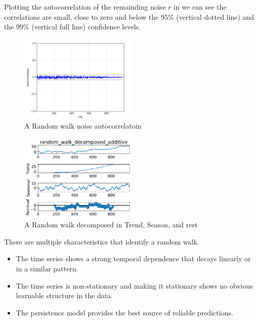Plotting the autocorrelation of the remainding noise $r$ in 
we can see the correlations are small, close to zero and below the 95\% (vertical dotted line) and the 99\% (vertical full line)
confidence levels.
\begin{figure}[H]
  \centering
  \includegraphics[width=0.5\textwidth]{./figs/illustrations/random_walk_noise_autocorrelation.png}
  \hfill
  \caption{A Random walk noise autocorrelatoin}
  \label{fig:dataset:random_walk_noise_autocorrelation}
\end{figure}
\begin{figure}[H]
  \centering
  \includegraphics[width=0.5\textwidth]{./figs/code_generated/data_exploration/random_walk_decomposed_additive.png}
  \hfill
  \caption{A Random walk decomposed in Trend, Season, and rest}
  \label{fig:dataset:random_walk_decomposed}
\end{figure}


There are multiple characteristics that identify a random walk.
\begin{itemize}
  \item The time series shows a strong temporal dependence that decays linearly or in a similar pattern.
  \item The time series is non-stationary and making it stationary shows no obvious learnable structure in the data.
  \item The persistence model provides the best source of reliable predictions.
\end{itemize}
